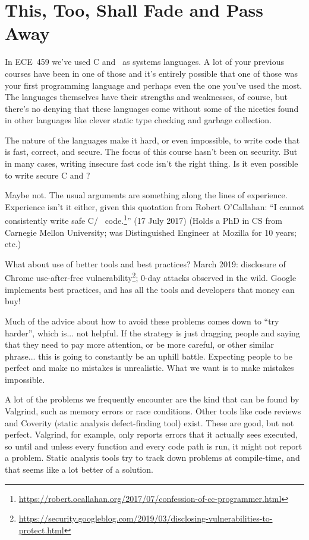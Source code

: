 




\section*{This, Too, Shall Fade and Pass Away}
In ECE~459 we've used C and \CPP~as systems languages. A lot of your previous courses have been in one of those and it's entirely possible that one of those was your first programming language and perhaps even the one you've used the most. The languages themselves have their strengths and weaknesses, of course, but there's no denying that these languages come without some of the niceties found in other languages like clever static type checking and garbage collection.


The nature of the languages make it hard, or even impossible, to write code that is fast, correct, and secure. The focus of this course hasn't been on security. But in many cases, writing insecure fast code isn't the right thing. Is it even possible to write secure C and \CPP?

Maybe not. The usual arguments are something along the lines of experience. Experience isn't it either, given this quotation from Robert O'Callahan: ``I cannot consistently write safe C/\CPP~ code.\footnote{\url{https://robert.ocallahan.org/2017/07/confession-of-cc-programmer.html}}'' (17 July 2017) (Holds a PhD in CS from Carnegie Mellon University; was Distinguished Engineer at Mozilla for 10 years; etc.)

What about use of better tools and best practices? March 2019: disclosure of Chrome use-after-free vulnerability\footnote{\url{https://security.googleblog.com/2019/03/disclosing-vulnerabilities-to-protect.html}}; 0-day attacks
observed in the wild. Google implements best practices, and has all the tools and developers that
money can buy!

Much of the advice about how to avoid these problems comes down to ``try harder'', which is... not helpful. If the strategy is just dragging people and saying that they need to pay more attention, or be more careful, or other similar phrase... this is going to constantly be an uphill battle. Expecting people to be perfect and make no mistakes is unrealistic. What we want is to make mistakes impossible.

A lot of the problems we frequently encounter are the kind that can be found by Valgrind, such as memory errors or race conditions. Other tools like code reviews and Coverity (static analysis defect-finding tool) exist. These are good, but not perfect. Valgrind, for example, only reports errors that it actually sees executed, so until and unless every function and every code path is run, it might not report a problem. Static analysis tools try to track down problems at compile-time, and that seems like a lot better of a solution.


